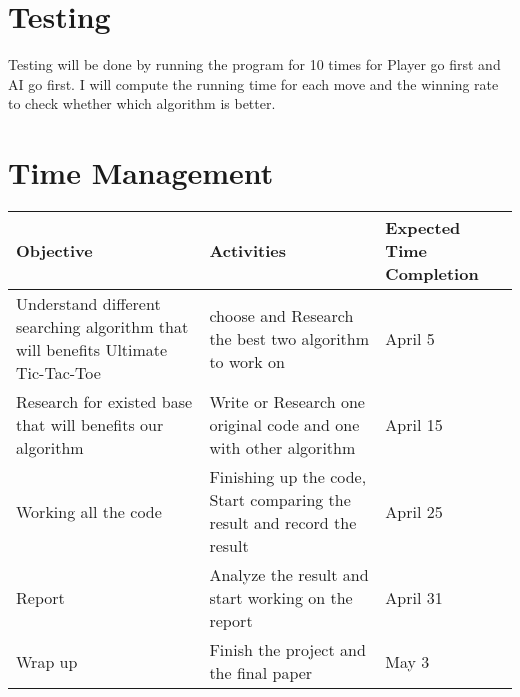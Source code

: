 \documentclass[12pt]{article}
\begin{document}
\section{Testing}
Testing will be done by running the program for 10 times for Player go first and AI go first. I will compute the running time for each move and the winning rate to check whether which algorithm is better.
\section{Time Management}
\begin{tabular}{| m{5cm} | m{5cm} | m{5cm} | } 
\hline 
Objective & Activities & Expected Time Completion\\ 
\hline \hline
Understand different searching algorithm that will benefits Ultimate Tic-Tac-Toe & choose and Research the best two algorithm to work on & April 5 \\

\hline
Research for existed base that will benefits our algorithm & Write or Research one original code and one with other algorithm & April 15\\ 
\hline
Working all the code & Finishing up the code, Start comparing the result and record the result & April 25 \\

\hline
Report & Analyze the result and start working on the report & April 31\\ 
\hline
Wrap up & Finish the project and the final paper & May 3 \\
\hline
   \end{tabular}
\newpage


\cite{*}
\end{document}
